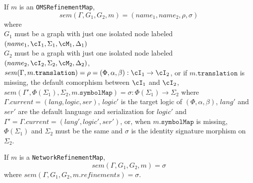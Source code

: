 \documentclass[10pt, a4paper]{isov2}
\newcommand*{\syntax}[1]{\texttt{#1}}
\newcommand{\current}{\mathit{current}}
\begin{document}
If $m$ is an \syntax{OMSRefinementMap},
$$sem(\Gamma, G_1,G_2,m) = (name_1, name_2, \rho,\sigma)$$
\noindent
where\\ $G_1$ must be a graph with just one isolated node
labeled $(name_1,\cI_1,\Sigma_1,\cM_1,\Delta_1)$ \\
$G_2$ must be a graph with just one isolated node
labeled $(name_2,\cI_2,\Sigma_2,\cM_2,\Delta_2)$,\\
$sem(\Gamma,m.\syntax{translation}) = \rho = (\Phi,\alpha,\beta):\cI_1\to\cI_2$,
or if $m.\syntax{translation}$ is missing, the default comorphism
between $\cI_1$ and $\cI_2$,\\
$sem(\Gamma', \Phi(\Sigma_1),\Sigma_2,m.\syntax{symbolMap}) = \sigma:\Phi(\Sigma_1) \to \Sigma_2$
where $\Gamma.\current= \allowbreak(lang,\allowbreak logic,ser)$,
$logic'$ is the target logic of $(\Phi,\alpha,\beta)$,
$lang'$ and $ser'$ are the default language and serialization for $logic'$
and $\Gamma' = \Gamma.\current=(lang', logic',ser')$,
or, when $m.\syntax{symbolMap}$ is missing,
$\Phi(\Sigma_1)$ and $\Sigma_2$ must be the same and $\sigma$ is the identity
signature morphism on $\Sigma_2$.

If $m$ is a \syntax{NetworkRefinementMap},
$$sem(\Gamma, G_1,G_2, m) = \sigma$$
\noindent
where
$sem(\Gamma,G_1,G_2, m.refinements) = \sigma$.


\end{document}
